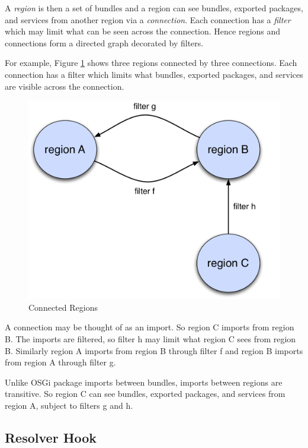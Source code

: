 \documentclass[a4paper,9pt]{article}
\begin{document}
A \textit{region} is then a set of bundles and a region can see bundles, exported packages, and services
from another region via a \textit{connection}. Each connection has a \textit{filter} which may limit
what can be seen across the connection.
Hence regions and connections form a directed graph decorated by filters.

For example, Figure \ref{fig:conn} shows three regions connected by three connections.
Each connection has a filter which limits what bundles, exported packages, and services
are visible across the connection.

\begin{figure}[h!]
\begin{center}
\includegraphics*[scale=0.35]{connected-regions.pdf}
\caption{Connected Regions}
\end{center}
\label{fig:conn}
\end{figure}

A connection may be thought of as an import. So region C imports from region B.
The imports are filtered, so filter h may limit what region C sees from region B.
Similarly region A imports from region B through filter f and region B imports from region A through
filter g.

Unlike OSGi package imports between bundles, imports between regions are transitive.
So region C can see bundles, exported packages, and services from region A, subject to filters g and h.

\subsection{Resolver Hook}
\end{document}

